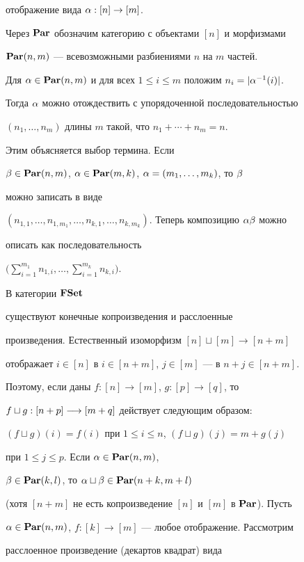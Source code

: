 отображение вида $\alpha:[n]\to [m]$.


Через $\bold{Par}$ обозначим категорию с объектами $[n]$ и морфизмами


$\bold{Par}(n,m)$ --- всевозможными разбиениями $n$ на $m$ частей.


Для $\alpha\in \bold{Par}(n,m)$ и для всех $1\le i\le m$ положим $n_i=|\alpha^{-1}(i)|$.


Тогда $\alpha$ можно отождествить с упорядоченной последовательностью


$(n_1,\dotsc, n_m)$ длины $m$ такой, что $n_1+\dotsb +n_m=n$.


Этим объясняется выбор термина. Если


$\beta\in \bold{Par}(n,m)$, $\alpha\in \bold{Par}(m,k)$, $\alpha=(m_1,\dotsc,m_k)$, то $\beta$


можно записать в виде


$(n_{1,1},\dotsc,n_{1,m_1},\dotsc,


n_{k,1},\dotsc,n_{k,m_k})$. Теперь композицию $\al\be$ можно


описать как последовательность


$\Big(\sum\limits_{i=1}^{m_1} n_{1,i},\dotsc,


\sum\limits_{i=1}^{m_k} n_{k,i}\Big)$.





В категории ${\bold F}\bold{Set}$


существуют конечные копроизведения и расслоенные


произведения. Естественный изоморфизм $[n]\sqcup [m]\to [n+m]$


отображает $i\in[n] $ в $ i\in [n+m]$, $j\in [m]$ --- в $n+j\in [n+m]$.


Поэтому, если даны $f:[n]\to [m]$, $g:[p]\to [q]$, то


$f\sqcup g :[n+p]\overset{}{\longrightarrow}{} [m+q]$ действует следующим образом:


$ (f\sqcup g)(i)=f(i)$ при $1\le i \le n$, $ (f\sqcup g)(j)=m+g(j)$


при $1\le j \le p$. Если $\alpha\in \bold{Par}(n,m)$,


$\beta\in \bold{Par}(k,l)$, то $\alpha\sqcup \beta \in \bold{Par}(n+k,m+l)$


(хотя $[n+m]$ не есть копроизведение $[n]$ и $[m]$ в $\bold{Par}$). Пусть


$\alpha\in \bold{Par}(n,m)$, $f:[k]\to [m]$ --- любое отображение. Рассмотрим


расслоенное произведение (декартов квадрат) вида


$$


